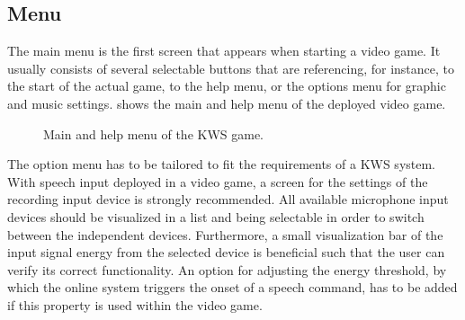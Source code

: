 \subsection{Menu}\label{sec:game_design_menu}
The main menu is the first screen that appears when starting a video game. 
It usually consists of several selectable buttons that are referencing, for instance, to the start of the actual game, to the help menu, or the options menu for graphic and music settings.
 shows the main and help menu of the deployed video game.
\begin{figure}[!ht]
  \centering
  \quad
  \caption{Main and help menu of the KWS game.}
  \label{fig:game_design_menu_mainhelp}
\end{figure}
\FloatBarrier
\noindent
The option menu has to be tailored to fit the requirements of a KWS system.
With speech input deployed in a video game, a screen for the settings of the recording input device is strongly recommended.
All available microphone input devices should be visualized in a list and being selectable in order to switch between the independent devices.
Furthermore, a small visualization bar of the input signal energy from the selected device is beneficial such that the user can verify its correct functionality.
An option for adjusting the energy threshold, by which the online system triggers the onset of a speech command, has to be added if this property is used within the video game.
